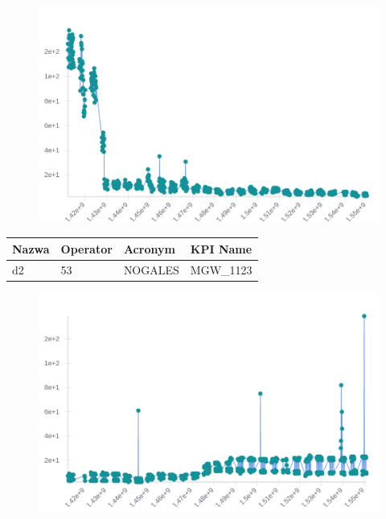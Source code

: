 \documentclass[eng,printmode]{mgr}
\begin{document}
\begin{figure}[H]
  \begin{center}
  \includegraphics[scale=0.53]{d1}
  \end{center}
\end{figure}
\newpage

\begingroup
\fontsize{10pt}{12pt}\selectfont
\begin{tabu} to 0.9\textwidth { | X[l] | X[l] | X[l] | X[l] |}
\hline
\textbf{Nazwa} & \textbf{Operator} & \textbf{Acronym} & \textbf{KPI Name} \\
\hline
d2 & 53 & NOGALES & MGW\_1123 \\
\hline
\end{tabu}
\endgroup

\begin{figure}[H]
  \begin{center}
  \includegraphics[scale=0.53]{d2}
  \end{center}
\end{figure}
\newpage
\end{document}
